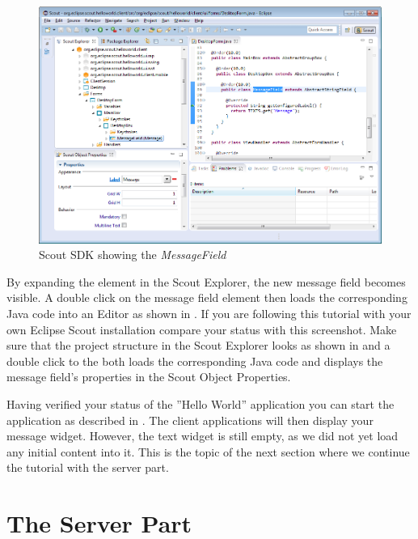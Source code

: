 \documentclass[a4paper,10pt,twoside]{book}
\begin{document}
\begin{figure}
\includegraphics[width=14cm]{sdk_helloworld_messagefield.png}
\caption{Scout SDK showing the \it{MessageField}}
\end{figure}

By expanding the  element in the Scout Explorer, the new message field becomes visible. 
A double click on the message field element then loads the corresponding Java code into an Editor as shown in .
If you are following this tutorial with your own Eclipse Scout installation compare your status with this screenshot.
Make sure that the project structure in the Scout Explorer looks as shown in  and a double click to the  both loads the corresponding Java code and displays the message field's properties in the Scout Object Properties.

Having verified your status of the ''Hello World'' application you can start the application as described in .
The client applications will then display your message widget.
However, the text widget is still empty, as we did not yet load any initial content into it.
This is the topic of the next section where we continue the tutorial with the server part.

\section{The Server Part}
\end{document}

